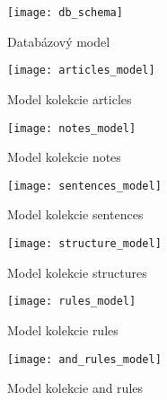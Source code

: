 \begin{figure}[H]
	\begin{center}\texttt{[image: db\_schema]}\end{center}
	\caption[Databázový model]{Databázový model}
\end{figure}

\begin{figure}[H]
	\begin{center}\texttt{[image: articles\_model]}\end{center}
	\caption[Model kolekcie articles]{Model kolekcie articles}
\end{figure}

\begin{figure}[H]
	\begin{center}\texttt{[image: notes\_model]}\end{center}
	\caption[Model kolekcie notes]{Model kolekcie notes}\label{fig:notes_collection_model}
\end{figure}

\begin{figure}[H]
	\begin{center}\texttt{[image: sentences\_model]}\end{center}
	\caption[Model kolekcie sentences]{Model kolekcie sentences}\label{fig:sentences_collection_model}
\end{figure}

\begin{figure}[H]
	\begin{center}\texttt{[image: structure\_model]}\end{center}
	\caption[Model kolekcie structures]{Model kolekcie structures}\label{fig:structures_collection_model}
\end{figure}

\begin{figure}[H]
	\begin{center}\texttt{[image: rules\_model]}\end{center}
	\caption[Model kolekcie rules]{Model kolekcie rules}\label{fig:rules_collection_model}
\end{figure}

\begin{figure}[H]
	\begin{center}\texttt{[image: and\_rules\_model]}\end{center}
	\caption[Model kolekcie and rules]{Model kolekcie and rules}\label{fig:and_rules_collection_model}
\end{figure}

